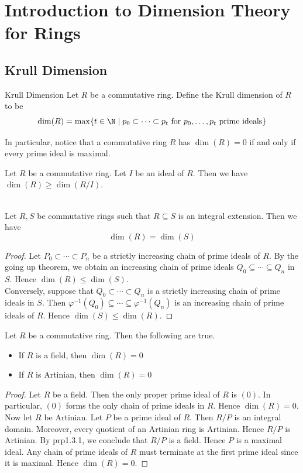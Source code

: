 \documentclass[a4paper]{article}
\begin{document}
\pagebreak
\section{Introduction to Dimension Theory for Rings}
\subsection{Krull Dimension}
\begin{defn}{Krull Dimension}{} Let $R$ be a commutative ring. Define the Krull dimension of $R$ to be $$\dim(R)=\max\{t\in\N\;|\;p_0\subset\dots\subset p_t\text{ for }p_0,\dots,p_t\text{ prime ideals}\}$$
\end{defn}

In particular, notice that a commutative ring $R$ has $\dim(R)=0$ if and only if every prime ideal is maximal. 

\begin{lmm}{}{} Let $R$ be a commutative ring. Let $I$ be an ideal of $R$. Then we have $\dim(R)\geq\dim(R/I)$. 
\end{lmm}

\begin{lmm}{}{}\\
Let $R,S$ be commutative rings such that $R\subseteq S$ is an integral extension. Then we have $$\dim(R)=\dim(S)$$
\begin{proof}
Let $P_0\subset\cdots\subset P_n$ be a strictly increasing chain of prime ideals of $R$. By the going up theorem, we obtain an increasing chain of prime ideals $Q_0\subseteq\cdots\subseteq Q_n$ in $S$. Hence $\dim(R)\leq\dim(S)$. \\

Conversely, suppose that $Q_0\subset\cdots\subset Q_n$ is a strictly increasing chain of prime ideals in $S$. Then $\varphi^{-1}(Q_0)\subseteq\cdots\subseteq\varphi^{-1}(Q_n)$ is an increasing chain of prime ideals of $R$. Hence $\dim(S)\leq\dim(R)$. 
\end{proof}
\end{lmm}

\begin{lmm}{}{} Let $R$ be a commutative ring. Then the following are true. 
\begin{itemize}
\item If $R$ is a field, then $\dim(R)=0$
\item If $R$ is Artinian, then $\dim(R)=0$
\end{itemize} 
\begin{proof}
Let $R$ be a field. Then the only proper prime ideal of $R$ is $(0)$. In particular, $(0)$ forms the only chain of prime ideals in $R$. Hence $\dim(R)=0$. \\

Now let $R$ be Artinian. Let $P$ be a prime ideal of $R$. Then $R/P$ is an integral domain. Moreover, every quotient of an Artinian ring is Artinian. Hence $R/P$ is Artinian. By prp1.3.1, we conclude that $R/P$ is a field. Hence $P$ is a maximal ideal. Any chain of prime ideals of $R$ must terminate at the first prime ideal since it is maximal. Hence $\dim(R)=0$. 
\end{proof}
\end{lmm}
\end{document}
